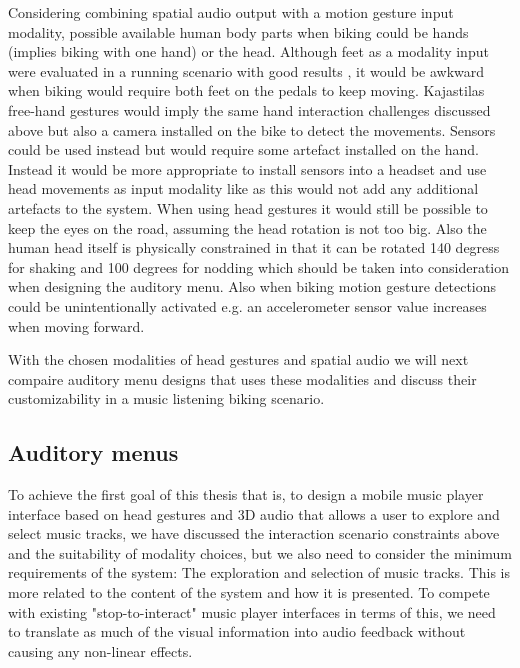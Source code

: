 Considering combining spatial audio output with a motion gesture input modality, possible available human body parts when biking could be hands (implies biking with one hand) or the head. Although feet as a modality input were evaluated in a running scenario with good results \cite{smus_running_2010}, it would be awkward when biking would require both feet on the pedals to keep moving. Kajastilas free-hand gestures \cite{kajastila_interaction_2013} would imply the same hand interaction challenges discussed above but also a camera installed on the bike to detect the movements. Sensors could be used instead but would require some artefact installed on the hand. Instead it would be more appropriate to install sensors into a headset and use head movements as input modality like \cite{park_gaze-directed_2011, brewster_multimodaleyes-freeinteraction_2003} as this would not add any additional artefacts to the system. When using head gestures it would still be possible to keep the eyes on the road, assuming the head rotation is not too big. Also the human head itself is physically constrained in that it can be rotated 140 degress for shaking and 100 degrees for nodding \cite{lopresti_neck_2000} which should be taken into consideration when designing the auditory menu. Also when biking motion gesture detections could be unintentionally activated e.g. an accelerometer sensor value increases when moving forward.

With the chosen modalities of head gestures and spatial audio we will next compaire auditory menu designs that uses these modalities and discuss their customizability in a music listening biking scenario.

\subsection{Auditory menus}
To achieve the first goal of this thesis that is, to design a mobile music player interface based on head gestures and 3D audio that allows a user to explore and select music tracks, we have discussed the interaction scenario constraints above and the suitability of modality choices, but we also need to consider the minimum requirements of the system: The exploration and selection of music tracks. This is more related to the content of the system and how it is presented. To compete with existing "stop-to-interact" music player interfaces in terms of this, we need to translate as much of the visual information into audio feedback without causing any non-linear effects.

